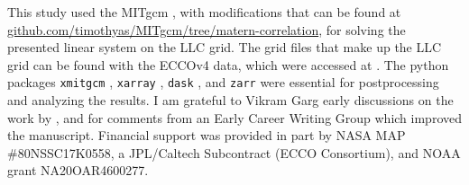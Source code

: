 \documentclass[draft]{Feb-3-22-latex-templates/agujournal2019}
\begin{document}










\appendix




%

\acknowledgments
This study used the MITgcm \citep{campin_mitgcmmitgcm_2021}, with modifications
that can be found at \url{github.com/timothyas/MITgcm/tree/matern-correlation}, for solving the
presented linear system on the LLC grid.
The grid files that make up the LLC grid can be found with the ECCOv4 data,
which were accessed at \citep{ecco_v4r2}.
The python packages \texttt{xmitgcm} \citep{abernathey_2021_5139886},
\texttt{xarray} \citep{hoyer2017xarray}, \texttt{dask} \citep{dask}, and
\texttt{zarr} \citep{alistair_miles_2020_3773450}
were essential for postprocessing and analyzing the results.
I am grateful to Vikram Garg early discussions on the
work by \citet{RSSB:RSSB777}, and for comments from an Early Career Writing
Group which improved the manuscript.
Financial support was provided in part by NASA MAP \#80NSSC17K0558, a JPL/Caltech
Subcontract (ECCO Consortium), and NOAA grant NA20OAR4600277.


\end{document}
